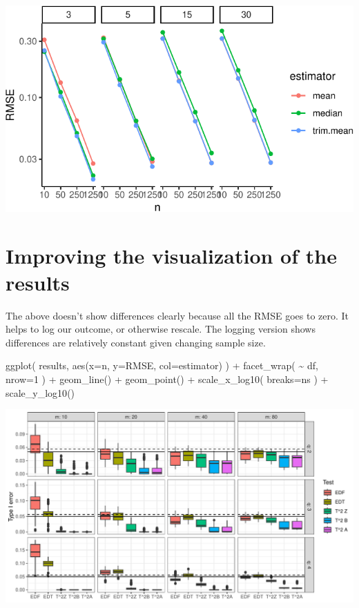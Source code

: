 \documentclass[
]{book}
\newenvironment{Shaded}{\begin{snugshade}}{\end{snugshade}}
\newcommand{\AttributeTok}[1]{\textcolor[rgb]{0.77,0.63,0.00}{#1}}
\newcommand{\DecValTok}[1]{\textcolor[rgb]{0.00,0.00,0.81}{#1}}
\newcommand{\FunctionTok}[1]{\textcolor[rgb]{0.00,0.00,0.00}{#1}}
\newcommand{\NormalTok}[1]{#1}
\newcommand{\SpecialCharTok}[1]{\textcolor[rgb]{0.00,0.00,0.00}{#1}}
\begin{document}
\begin{center}\includegraphics[width=0.75\linewidth]{Designing-Simulations-in-R_files/figure-latex/unnamed-chunk-180-1} \end{center}

\hypertarget{improving-the-visualization-of-the-results}{%
\section{Improving the visualization of the results}\label{improving-the-visualization-of-the-results}}

The above doesn't show differences clearly because all the RMSE goes to zero.
It helps to log our outcome, or otherwise rescale. The logging version shows
differences are relatively constant given changing sample size.

\begin{Shaded}
\begin{Highlighting}[]
\FunctionTok{ggplot}\NormalTok{( results, }\FunctionTok{aes}\NormalTok{(}\AttributeTok{x=}\NormalTok{n, }\AttributeTok{y=}\NormalTok{RMSE, }\AttributeTok{col=}\NormalTok{estimator) ) }\SpecialCharTok{+}
    \FunctionTok{facet\_wrap}\NormalTok{( }\SpecialCharTok{\textasciitilde{}}\NormalTok{ df, }\AttributeTok{nrow=}\DecValTok{1}\NormalTok{ ) }\SpecialCharTok{+}
    \FunctionTok{geom\_line}\NormalTok{() }\SpecialCharTok{+} \FunctionTok{geom\_point}\NormalTok{() }\SpecialCharTok{+}
    \FunctionTok{scale\_x\_log10}\NormalTok{( }\AttributeTok{breaks=}\NormalTok{ns ) }\SpecialCharTok{+}
    \FunctionTok{scale\_y\_log10}\NormalTok{()}
\end{Highlighting}
\end{Shaded}

\begin{center}\includegraphics[width=0.75\linewidth]{Designing-Simulations-in-R_files/figure-latex/unnamed-chunk-181-1} \end{center}
\end{document}

